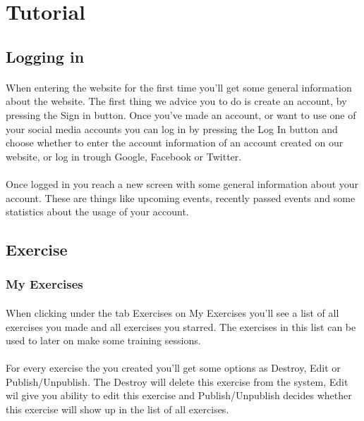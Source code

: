 \documentclass[11pt,a4paper]{scrartcl}
\begin{document}
\section{Tutorial}
\subsection{Logging in}
\paragraph{}When entering the website for the first time you'll get some general information about the website. The first thing we advice you to do is create an account, by pressing the Sign in button. Once you've made an account, or want to use one of your social media accounts you can log in by pressing the Log In button and choose whether to enter the account information of an account created on our website, or log in trough Google, Facebook or Twitter.
\paragraph{}Once logged in you reach a new screen with some general information about your account. These are things like upcoming events, recently passed events and some statistics about the usage of your account.

\subsection{Exercise}
\subsubsection{My Exercises}
\paragraph{}When clicking under the tab Exercises on My Exercises you'll see a list of all exercises you made and all exercises you starred. The exercises in this list can be used to later on make some training sessions.
\paragraph{}For every exercise the you created you'll get some options as Destroy, Edit or Publish/Unpublish. The Destroy will delete this exercise from the system, Edit wil give you ability to edit this exercise and Publish/Unpublish decides whether this exercise will show up in the list of all exercises.
\end{document}
